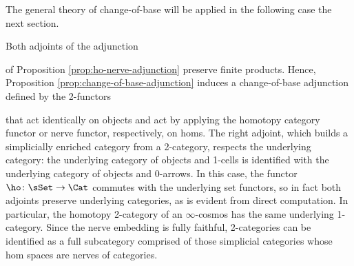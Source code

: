 

The general theory of change-of-base will be applied in the following case the next section.


\begin{example}\label{ex:nerve-ho-change-of-base}
Both adjoints of the adjunction
\begin{center}
\end{center} of Proposition \ref{prop:ho-nerve-adjunction} preserve finite products. Hence, Proposition \ref{prop:change-of-base-adjunction} induces a change-of-base adjunction defined by the 2-functors
\begin{center}
\end{center}
that act identically on objects and act by applying the homotopy category functor or nerve functor, respectively, on homs. %
  The right adjoint, which builds a simplicially enriched category from a 2-category, respects the underlying category: the underlying category of objects and 1-cells is identified with the underlying category of objects and 0-arrows. In this case, the functor $\ho \colon \sSet \to \Cat$ commutes with the underlying set functors, so in fact both adjoints preserve underlying categories, as is evident from direct computation. In particular, the homotopy 2-category of an $\infty$-cosmos has the same underlying 1-category. Since the nerve embedding is fully faithful, 2-categories can be identified as a full subcategory comprised of those simplicial categories whose hom spaces are nerves of categories.
\end{example}

